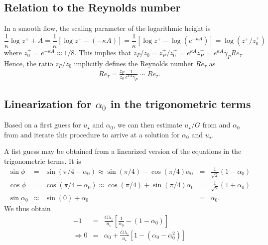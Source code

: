 \documentclass[a4paper,10pt]{amsart}
\begin{document}
\subsection{Relation to the Reynolds number}
In a smooth flow, the scaling parameter of the logarithmic height is
\[\frac{1}{\kappa}\log z^+ + A =\frac{1}{\kappa}\left[ \log z^+ - ( -\kappa A)\right]  = \frac{1}{\kappa}\left[\log z^+ - \log(e^{-\kappa A})\right] = \log(z^+/z_{0}^+) \]
where $z_{0}^+ = e^{-\kappa A}\approx 1/8$.
This implies that $z_P/z_0=z_{P}^{+}/z_{0}^+ = e^{\kappa A} z_{P}^{+} = e^{\kappa A} \gamma_P Re_\tau$. Hence, the ratio $z_P/z_0$ implicitly defines the Reynolds number $Re_\tau$ as
\begin{align}
  Re_\tau = \frac{z_P}{z_0} \frac{1}{e^{\kappa A} \gamma_P} \sim Re_\tau.
\end{align}

\subsection{Linearization for $\alpha_0$ in the trigonometric terms} 
Based on a first guess for $u_\star$ and $\alpha_0$, we can then estimate $u_\star/G$  from  and $\alpha_0$ from  and iterate this procedure
to arrive at a solution for $\alpha_0$ and $u_\star$. 

A fist guess may be obtained from a linearized version of the equations in the trigonometric terms.
It is 
\begin{subequations}
  \begin{align} 
    \sin\phi &=& \sin(\pi/4-\alpha_0) \approx \sin(\pi/4) - \cos(\pi/4) \alpha_0 &=& \frac{1}{\sqrt{2}} (1-\alpha_0) \\
    \cos\phi &=& \cos(\pi/4-\alpha_0) \approx \cos(\pi/4) + \sin(\pi/4) \alpha_0 &=& \frac{1}{\sqrt{2}} (1+\alpha_0) \\ 
    \sin\alpha_0 &\approx& \sin(0) + \alpha_0 &=& \alpha_0.  
  \end{align}
\end{subequations}
We thus obtain
\begin{align}
  -1 &=& \frac{G\lambda_z}{u_\star}
         \left[\frac{1}{\alpha_0} -(1-\alpha_0)  \right] \\ 
  \Rightarrow 0 &=& \alpha_0 + \frac{G\lambda_z}{u_\star} \left[ 1- (\alpha_0-\alpha_0^{2})\right] 
\end{align} 
\end{document}
